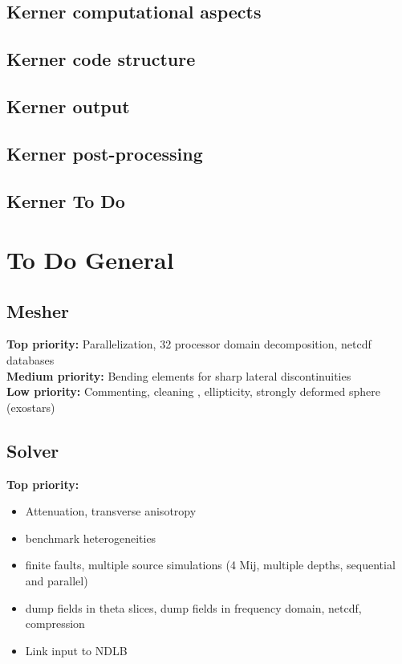 \documentclass[11pt,letter,fleqn,english,notitlepage]{article}
\begin{document}
\subsection{Kerner computational aspects}
\subsection{Kerner code structure}
\subsection{Kerner output}
\subsection{Kerner post-processing}
\subsection{Kerner To Do}
\newpage
\section{To Do General}
\subsection{Mesher}
\textbf{Top priority:} Parallelization, 32 processor domain decomposition, netcdf databases\\

\noindent\textbf{Medium priority:} Bending elements for sharp lateral
discontinuities\\

\noindent\textbf{Low priority:} Commenting, cleaning , ellipticity, strongly deformed sphere
(exostars)

\subsection{Solver}
\noindent\textbf{Top priority:} 
\begin{itemize}
\item Attenuation, transverse anisotropy
\item benchmark heterogeneities
\item finite faults, multiple source simulations (4 Mij,
multiple depths, sequential and parallel)
\item dump fields in theta slices, dump fields in frequency domain,
  netcdf, compression
\item Link input to NDLB
\end{itemize}
\end{document}
